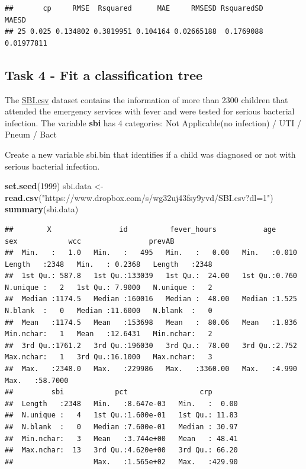 \documentclass[
]{book}
\newenvironment{Shaded}{\begin{snugshade}}{\end{snugshade}}
\newcommand{\DecValTok}[1]{\textcolor[rgb]{0.00,0.00,0.81}{#1}}
\newcommand{\FunctionTok}[1]{\textcolor[rgb]{0.13,0.29,0.53}{\textbf{#1}}}
\newcommand{\NormalTok}[1]{#1}
\newcommand{\OtherTok}[1]{\textcolor[rgb]{0.56,0.35,0.01}{#1}}
\newcommand{\StringTok}[1]{\textcolor[rgb]{0.31,0.60,0.02}{#1}}
\begin{document}
\begin{verbatim}
##       cp     RMSE  Rsquared      MAE     RMSESD RsquaredSD      MAESD
## 25 0.025 0.134802 0.3819951 0.104164 0.02665188  0.1769088 0.01977811
\end{verbatim}

\subsection*{Task 4 - Fit a classification tree}\label{task-4---fit-a-classification-tree}

The \href{https://www.dropbox.com/s/da3by5vuzkv77xi/SBI.csv?dl=1}{SBI.csv} dataset
contains the information of more than 2300 children that attended the
emergency services with fever and were tested for serious bacterial infection.
The variable \textbf{sbi} has
4 categories: Not Applicable(no infection) / UTI / Pneum / Bact

Create a new variable sbi.bin that identifies if a child was diagnosed
or not with serious bacterial infection.

\begin{Shaded}
\begin{Highlighting}[]
\FunctionTok{set.seed}\NormalTok{(}\DecValTok{1999}\NormalTok{)}
\NormalTok{sbi.data }\OtherTok{\textless{}{-}} \FunctionTok{read.csv}\NormalTok{(}\StringTok{"https://www.dropbox.com/s/wg32uj43fsy9yvd/SBI.csv?dl=1"}\NormalTok{)}
\FunctionTok{summary}\NormalTok{(sbi.data)}
\end{Highlighting}
\end{Shaded}

\begin{verbatim}
##        X                id          fever_hours           age               sex            wcc                prevAB    
##  Min.   :   1.0   Min.   :   495   Min.   :   0.00   Min.   :0.010   Length   :2348   Min.   : 0.2368   Length   :2348  
##  1st Qu.: 587.8   1st Qu.:133039   1st Qu.:  24.00   1st Qu.:0.760   N.unique :   2   1st Qu.: 7.9000   N.unique :   2  
##  Median :1174.5   Median :160016   Median :  48.00   Median :1.525   N.blank  :   0   Median :11.6000   N.blank  :   0  
##  Mean   :1174.5   Mean   :153698   Mean   :  80.06   Mean   :1.836   Min.nchar:   1   Mean   :12.6431   Min.nchar:   2  
##  3rd Qu.:1761.2   3rd Qu.:196030   3rd Qu.:  78.00   3rd Qu.:2.752   Max.nchar:   1   3rd Qu.:16.1000   Max.nchar:   3  
##  Max.   :2348.0   Max.   :229986   Max.   :3360.00   Max.   :4.990                    Max.   :58.7000                   
##         sbi            pct                 crp        
##  Length   :2348   Min.   :8.647e-03   Min.   :  0.00  
##  N.unique :   4   1st Qu.:1.600e-01   1st Qu.: 11.83  
##  N.blank  :   0   Median :7.600e-01   Median : 30.97  
##  Min.nchar:   3   Mean   :3.744e+00   Mean   : 48.41  
##  Max.nchar:  13   3rd Qu.:4.620e+00   3rd Qu.: 66.20  
##                   Max.   :1.565e+02   Max.   :429.90
\end{verbatim}
\end{document}
